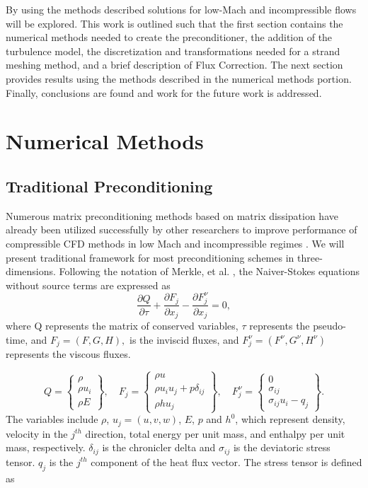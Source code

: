 \documentclass[draft]{aiaa-pretty}
\begin{document}
By using the methods described solutions for low-Mach and incompressible flows will be explored.  This work is outlined such that the first section contains the numerical
methods needed to create the preconditioner, the addition of the turbulence model, the discretization and transformations needed for a strand meshing method, and a brief description
of Flux Correction. 
The next section provides results
using the methods described in the numerical methods portion.  Finally, conclusions are found and work for the future work is addressed.

\section{Numerical Methods}
\subsection{Traditional Preconditioning}
Numerous matrix preconditioning methods based on matrix dissipation have already been utilized successfully by other researchers to improve performance of compressible CFD
methods in low Mach and incompressible regimes \cite{Folkner2014,Weiss1995,Caughey2003}.  We will present traditional framework for most preconditioning schemes in
three-dimensions.  Following the notation of Merkle, et al. \cite{Merkle1998}, the Naiver-Stokes equations without source terms are expressed
as
\begin{equation}
\frac{\partial Q}{\partial \tau} + \frac{\partial F_j}{\partial x_j} - \frac{\partial F_j^\nu}{\partial x_j} = 0,
\label{Euler}
\end{equation}
where Q represents the matrix of conserved variables, $\tau$ represents the pseudo-time, and $F_j = (F, G, H),$ is the inviscid fluxes, and $F^\nu_j = (F^\nu,G^\nu,H^\nu)$ represents the viscous fluxes.

\begin{equation}
  Q = \begin{Bmatrix}
    \rho \\ \rho u_i \\ \rho E
  \end{Bmatrix}, \quad
  F_j = \begin{Bmatrix}
    \rho u \\ \rho u_iu_j + p\delta_{ij} \\ \rho h u_j
  \end{Bmatrix}, \quad
  F^\nu_j = \begin{Bmatrix}
    0 \\ \sigma_{ij}  \\ \sigma_{ij}u_i-q_j
  \end{Bmatrix}.
\end{equation}
The variables include $\rho$, $u_j = (u,v,w)$, $E$, $p$ and $h^0$, which represent density, velocity in the $j^{th}$ direction, total energy per unit mass,
and enthalpy per unit mass, respectively. $\delta_{ij}$ is the chronicler delta and $\sigma_{ij}$ is the deviatoric stress tensor. $q_j$ is the $j^{th}$ component of the 
heat flux vector.
The stress tensor is defined as
\end{document}
